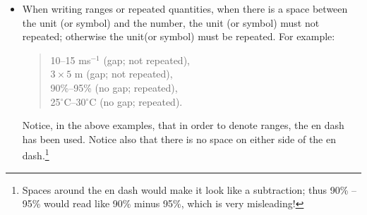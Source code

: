 \begin{itemize}
\item When writing ranges or repeated quantities, when there is a space between the unit (or symbol) and the number, the unit (or symbol) must not repeated; otherwise the unit(or symbol) must be repeated. For example:
\begin{quote}
10--15 ms$^{-1}$ \quad {} (gap; not repeated), \\
$3 \times 5$ m \quad {} (gap; not repeated), \\
90\%--95\% \quad {} (no gap; repeated), \\
25$^\circ$C--30$^\circ$C \quad {} (no gap; repeated).
\end{quote}
Notice, in the above examples, that in order to denote ranges, the en dash  has been used. Notice also that there is no space on either side of the en dash.\footnote{Spaces around the en dash would make it look like a subtraction; thus 90\% -- 95\% would read like 90\% minus 95\%, which is very misleading!}

\end{itemize}

